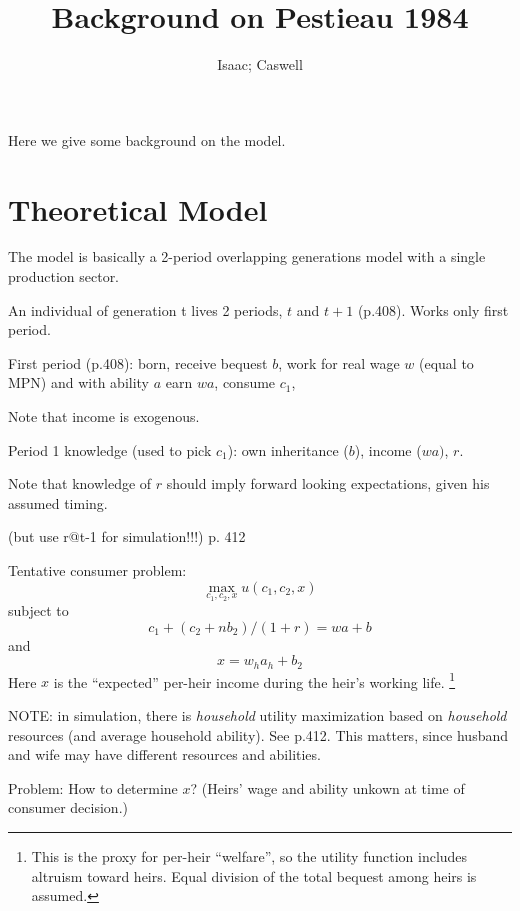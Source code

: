 \documentclass{article}
\begin{document}
\author{Isaac; Caswell}
\title{Background on Pestieau 1984}
\maketitle

Here we give some background on the \citet{pestieau-1984-oep} model.


\section{Theoretical Model}

The model is basically a 2-period overlapping generations model with a single production sector.

An individual of generation t lives 2 periods, $t$ and $t+1$ (p.408).
Works only first period.

First period (p.408):
born,
receive bequest $b$,
work for real wage $w$ (equal to MPN) and with ability $a$ earn $wa$,
consume $c_{1}$,

Note that income is exogenous.

Period 1 knowledge (used to pick $c_{1}$):
own inheritance ($b$),
income ($wa)$, $r$.

Note that knowledge of $r$ should imply forward looking expectations,
given his assumed timing.

(but use r@t-1 for simulation!!!) p. 412

Tentative consumer problem:
\begin{equation}
\max_{c_{1},c_{2},x} u(c_{1}, c_{2}, x)
\end{equation}
subject to
\begin{equation}
c_{1} + (c_{2} + n b_{2})/(1+r) = w a + b
\end{equation}
and
\begin{equation}
x = w_{h}a_{h}+ b_{2}
\end{equation}
Here $x$ is the ``expected'' per-heir income during the heir's working life.%
\footnote{%
This is the proxy for per-heir ``welfare'',
so the utility function includes altruism toward heirs.
Equal division of the total bequest among heirs is assumed.
} %
%

NOTE: in simulation, there is \emph{household} utility maximization
based on \emph{household} resources (and average household ability).
See p.412.
This matters, since husband and wife may have different resources and abilities.


Problem: How to determine $x$?
(Heirs' wage and ability unkown at time of consumer decision.)
\end{document}
